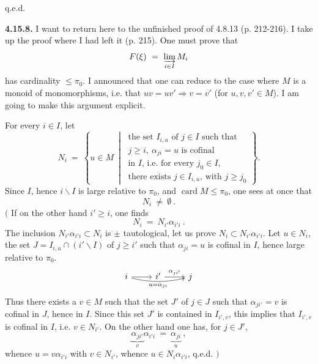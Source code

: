 \documentclass[11pt]{article}
\newcommand{\printedpage}[1]{\marginpar{\footnotesize p.~#1}}
\newcommand{\msp}[1]{\marginpar{\footnotesize [#1]}}
\newcommand{\card}{\operatorname{card}}
\begin{document}
\hfill q.e.d.

\printedpage{175}

\msp{page 453}
\textbf{4.15.8.} I want to return here to the unfinished proof of 4.8.13 (p. 212-216). I take up the proof where I had left it (p. 215). One must prove that
\[
F(\xi) \ = \ \varinjlim_{i\in I} M_i
\]
has cardinality $\leqslant \pi_0$. I announced that one can reduce to the case where $M$ is a monoid of monomorphisms, i.e. that $uv = uv' \Longrightarrow v = v'$ (for $u,v,v' \in M$). I am going to make this argument explicit.

For every $i\in I$, let
\[
N_i \ = \ \left\{ u \in M \ \middle| \ \begin{array}{l}
\text{the set } I_{i,u} \text{ of } j\in I \text{ such that}\\
j \geqslant i,\ \alpha_{ji} = u \text{ is cofinal}\\
\text{in } I\text{, i.e. for every } j_0\in I,\\
\text{there exists } j \in I_{i,u}\text{, with } j \geqslant j_0
\end{array} \right\} .
\tag*{(4.15.8.1)}
\]
Since $I$, hence $i\backslash I$ is large relative to $\pi_0$, and $\card M \leqslant \pi_0$, one sees at once that
\[
N_i \ \neq \ \emptyset \ .
\tag*{(4.15.8.2)}
\]
$\Big($ If on the other hand $i' \geqslant i$, one finds
\[
N_i \ = \ N_{i'}\alpha_{i'i} \ .
\tag*{(4.15.8.3)}
\]
The inclusion $N_{i'}\alpha_{i'i} \subset N_i$ is $\pm$ tautological, let us prove $N_i \subset N_{i'}\alpha_{i'i}$. Let $u \in N_i$, the set $J = I_{i,u} \cap (i'\backslash I)$ of $j \geqslant i'$ such that $\alpha_{ji} = u$ is cofinal in $I$, hence large relative to $\pi_0$.
\[
\begin{tikzcd}
i \arrow[r] \arrow[rr, bend right=12, "u = \alpha_{ji}"'] & i' \arrow[r, "\alpha_{ji'}"] & j
\end{tikzcd}
\]
Thus there exists a $v \in M$ such that the set $J'$ of $j\in J$ such that $\alpha_{ji'} = v$
\msp{page 454}
is cofinal in $J$, hence in $I$. Since this set $J'$ is contained in $I_{i',v}$, this implies that $I_{i',v}$ is cofinal in $I$, i.e. $v \in N_{i'}$. On the other hand one has, for $j \in J'$,
\[
\underbrace{\alpha_{ji'}}_{v}\alpha_{i'i} \ = \ \underbrace{\alpha_{ji}}_{u} \ ,
\]
whence $u = v\alpha_{i'i}$ with $v\in N_{i'}$, whence $u \in N_i\alpha_{i'i}$, q.e.d. $\Big)$ %
\end{document}
